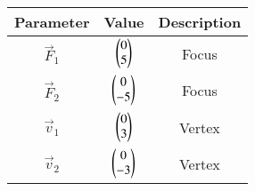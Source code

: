 
\begin{tabular}[]{|c|c|c|}
\hline
Parameter & Value & Description \\ \hline
$\vec{F}_1$	& $\begin{pmatrix}0\\5\end{pmatrix}$ & Focus\\ \hline
$\vec{F}_2$	& $\begin{pmatrix}0\\-5\end{pmatrix}$ & Focus\\ \hline
$\vec{v}_1$	& $\begin{pmatrix}0\\3\end{pmatrix}$ & Vertex \\ \hline
$\vec{v}_2$ 	& $\begin{pmatrix}0\\-3\end{pmatrix}$ & Vertex\\ \hline
\end{tabular}
